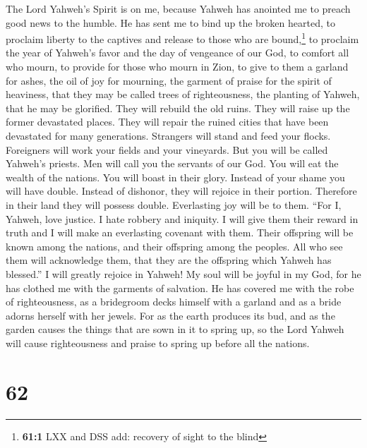  The Lord Yahweh's Spirit is on me, because Yahweh has
anointed me to preach good news to the humble. He has sent me to bind up
the broken hearted, to proclaim liberty to the captives and release to
those who are bound,\footnote{\textbf{61:1} LXX and DSS add: recovery of
  sight to the blind}  to proclaim the year of Yahweh's
favor and the day of vengeance of our God, to comfort all who mourn,
 to provide for those who mourn in Zion, to give to them a
garland for ashes, the oil of joy for mourning, the garment of praise
for the spirit of heaviness, that they may be called trees of
righteousness, the planting of Yahweh, that he may be glorified.
 They will rebuild the old ruins. They will raise up the
former devastated places. They will repair the ruined cities that have
been devastated for many generations.  Strangers will
stand and feed your flocks. Foreigners will work your fields and your
vineyards.  But you will be called Yahweh's priests. Men
will call you the servants of our God. You will eat the wealth of the
nations. You will boast in their glory.  Instead of your
shame you will have double. Instead of dishonor, they will rejoice in
their portion. Therefore in their land they will possess double.
Everlasting joy will be to them.  ``For I, Yahweh, love
justice. I hate robbery and iniquity. I will give them their reward in
truth and I will make an everlasting covenant with them. 
Their offspring will be known among the nations, and their offspring
among the peoples. All who see them will acknowledge them, that they are
the offspring which Yahweh has blessed.''  I will greatly
rejoice in Yahweh! My soul will be joyful in my God, for he has clothed
me with the garments of salvation. He has covered me with the robe of
righteousness, as a bridegroom decks himself with a garland and as a
bride adorns herself with her jewels.  For as the earth
produces its bud, and as the garden causes the things that are sown in
it to spring up, so the Lord Yahweh will cause righteousness and praise
to spring up before all the nations.

\hypertarget{section-59}{%
\section{62}\label{section-59}}

